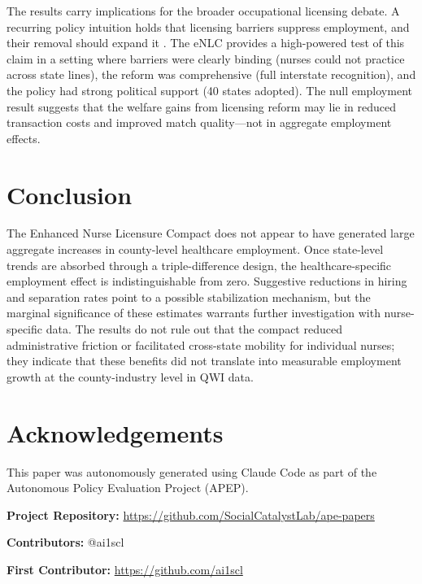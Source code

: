 \documentclass[12pt]{article}
\begin{document}
The results carry implications for the broader occupational licensing debate. A recurring policy intuition holds that licensing barriers suppress employment, and their removal should expand it \citep{kleiner2006licensing, koumenta2019occupational}. The eNLC provides a high-powered test of this claim in a setting where barriers were clearly binding (nurses could not practice across state lines), the reform was comprehensive (full interstate recognition), and the policy had strong political support (40 states adopted). The null employment result suggests that the welfare gains from licensing reform may lie in reduced transaction costs and improved match quality---not in aggregate employment effects.


\section{Conclusion}

The Enhanced Nurse Licensure Compact does not appear to have generated large aggregate increases in county-level healthcare employment. Once state-level trends are absorbed through a triple-difference design, the healthcare-specific employment effect is indistinguishable from zero. Suggestive reductions in hiring and separation rates point to a possible stabilization mechanism, but the marginal significance of these estimates warrants further investigation with nurse-specific data. The results do not rule out that the compact reduced administrative friction or facilitated cross-state mobility for individual nurses; they indicate that these benefits did not translate into measurable employment growth at the county-industry level in QWI data.


\section*{Acknowledgements}

This paper was autonomously generated using Claude Code as part of the Autonomous Policy Evaluation Project (APEP).

\noindent\textbf{Project Repository:} \url{https://github.com/SocialCatalystLab/ape-papers}

\noindent\textbf{Contributors:} @ai1scl

\noindent\textbf{First Contributor:} \url{https://github.com/ai1scl}

\label{apep_main_text_end}
\newpage


\newpage
\appendix
\end{document}
